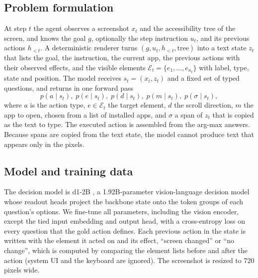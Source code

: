 \documentclass{article}
\newcommand{\base}{d1-2B}
\begin{document}
\subsection{Problem formulation}
At step $t$ the agent observes a screenshot $x_t$ and the accessibility tree of the screen, and knows the goal
$g$, optionally the step instruction $u_t$, and its previous actions $h_{<t}$. A deterministic renderer turns
$(g, u_t, h_{<t}, \text{tree})$ into a text state $z_t$ that lists the goal, the instruction, the current app,
the previous actions with their observed effects, and the visible elements
$\mathcal{E}_t = \{e_1,\dots,e_{n_t}\}$ with label, type, state and position. The model receives
$s_t = (x_t, z_t)$ and a fixed set of typed questions, and returns in one forward pass
\begin{equation}
  p(a \mid s_t),\; p(e \mid s_t),\; p(d \mid s_t),\; p(m \mid s_t),\; p(\sigma \mid s_t),
\end{equation}
where $a$ is the action type, $e \in \mathcal{E}_t$ the target element, $d$ the scroll direction, $m$ the app to
open, chosen from a list of installed apps, and $\sigma$ a span of $z_t$ that is copied as the text to type. The
executed action is assembled from the arg-max answers. Because spans are copied from the text state, the model
cannot produce text that appears only in the pixels.

\subsection{Model and training data}
The decision model is \base{} \citep{liquidd12026}, a 1.92B-parameter vision-language decision model whose readout
heads project the backbone state onto the token groups of each question's options. We fine-tune all parameters,
including the vision encoder, except the tied input embedding and output head, with a cross-entropy loss on every
question that the gold action defines. Each previous action in the state is written with the element it acted on and
its effect, ``screen changed'' or ``no change'', which is computed by comparing the element lists before and after
the action (system UI and the keyboard are ignored). The screenshot is resized to 720 pixels wide.
\end{document}
